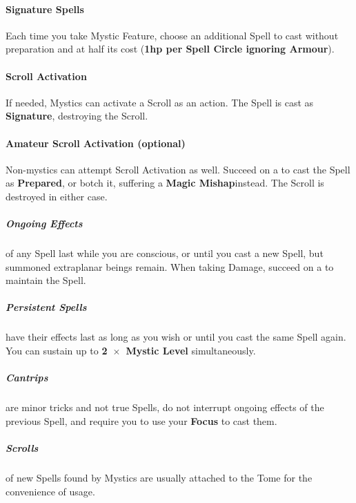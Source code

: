\documentclass[itdr/core]{subfiles}
\begin{document}
\paragraph{Signature Spells}
Each time you take Mystic Feature, choose an additional Spell to cast without preparation and at half its cost (\textbf{1hp per Spell Circle ignoring Armour}).

\paragraph{Scroll Activation}
If needed, Mystics can activate a Scroll as an action. The Spell is cast as \textbf{Signature}, destroying the Scroll.

\vspace{-0.5ex}
\begin{dbox}
	\paragraph{Amateur Scroll Activation (optional)}
	Non-mystics can attempt Scroll Activation as well. Succeed on a  to cast the Spell as \mbox{\textbf{Prepared}}, or botch it, suffering a \textbf{Magic Mishap}\footnotemark[1] \mbox{instead.} The Scroll is destroyed in either case.
\end{dbox}
\vspace{-0.5ex}

\subparagraph{Ongoing Effects} of any Spell last while you are conscious, or until you cast a new Spell, but summoned extraplanar beings remain. When taking Damage, succeed on a  to maintain the Spell.

\subparagraph{Persistent Spells} have their effects last as long as you wish or until you cast the same Spell again. You can sustain up to \textbf{2~$\times$~Mystic Level} simultaneously.

\enlargethispage{1ex}
\break

\subparagraph{Cantrips} are minor tricks and not true Spells, do not interrupt ongoing effects of the previous Spell, and require you to use your \textbf{Focus} to cast them.

\subparagraph{Scrolls} of new Spells found by Mystics are usually attached to the Tome for the convenience of usage.
\end{document}
